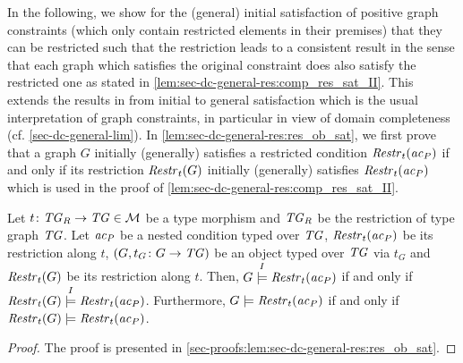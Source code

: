 In the following, we show for the (general) initial satisfaction of positive graph constraints (which only contain restricted elements in their premises) that they can be restricted such that the restriction leads to a consistent result in the sense that each graph which satisfies the original constraint does also satisfy the restricted one as stated in \cref{lem:sec-dc-general-res:comp_res_sat_II}.
This extends the results in \cite{DBLP:journals/corr/abs-1209-1436} from initial to general satisfaction which is the usual interpretation of graph constraints, in particular in view of domain completeness (cf. \cref{sec-dc-general-lim}).
In \cref{lem:sec-dc-general-res:res_ob_sat}, we first prove that a graph $G$ initially (generally) satisfies a restricted condition $\mathit{Restr}_t(\mathit{ac}_P)$ if and only if its restriction $\mathit{Restr}_t(G)$ initially (generally) satisfies $\mathit{Restr}_t(\mathit{ac}_P)$ which is used in the proof of \cref{lem:sec-dc-general-res:comp_res_sat_II}.

\begin{lemma}
\label{lem:sec-dc-general-res:res_ob_sat}
Let $t\colon \mathit{TG}_R \to \mathit{TG} \in {\cal M}$ be a type morphism and $\mathit{TG}_R$ be the restriction of type graph $\mathit{TG}$.
Let $\mathit{ac}_P$ be a nested condition typed over $\mathit{TG}$, $\mathit{Restr}_t(\mathit{ac}_P)$ be its restriction along $t$, $(G,t_G\colon G \to \mathit{TG})$ be an object typed over $\mathit{TG}$ via $t_G$ and $\mathit{Restr}_t(G)$ be its restriction along $t$.
Then, $G \stackrel{I}{\models} \mathit{Restr}_t(\mathit{ac}_P)$ if and only if $\mathit{Restr}_t(G) \stackrel{I}{\models} \mathit{Restr}_t(\mathit{ac}_P)$.
Furthermore, $G \models \mathit{Restr}_t(\mathit{ac}_P)$ if and only if $\mathit{Restr}_t(G) \models \mathit{Restr}_t(\mathit{ac}_P)$.
\envEndMarker
\end{lemma}

\begin{proof}
The proof is presented in \cref{sec-proofs:lem:sec-dc-general-res:res_ob_sat}.
\end{proof}

